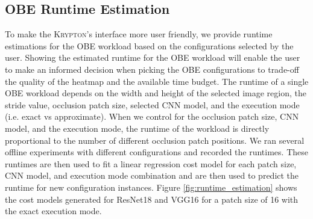 \documentclass{vldb}
\newcommand{\system}{\textsc{Krypton}}
\begin{document}


\subsection{OBE Runtime Estimation}
To make the \system's interface more user friendly, we provide runtime estimations for the OBE workload based on the configurations selected by the user.
Showing the estimated runtime for the OBE workload will enable the user to make an informed decision when picking the OBE configurations to trade-off the quality of the heatmap and the available time budget.
The runtime of a single OBE workload depends on the width and height of the selected image region, the stride value, occlusion patch size, selected CNN model, and the execution mode (i.e. exact vs approximate).
When we control for the occlusion patch size, CNN model, and the execution mode, the runtime of the workload is directly proportional to the number of different occlusion patch positions.
We ran several offline experiments with different configurations and recorded the runtimes.
These runtimes are then used to fit a linear regression cost model for each patch size, CNN model, and execution mode combination and are then used to predict the runtime for new configuration instances.
Figure \ref{fig:runtime_estimation} shows the cost models generated for ResNet18 and VGG16 for a patch size of 16 with the exact execution mode.
\end{document}
